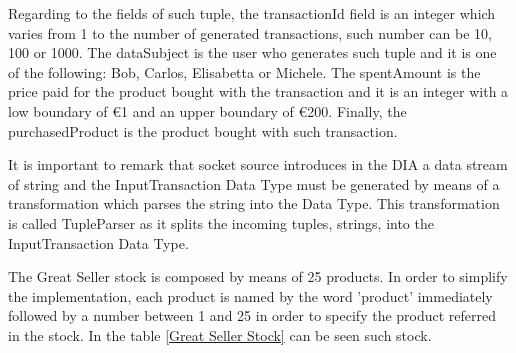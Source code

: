 Regarding to the fields of such tuple, the transactionId field is an integer which varies from 1 to the number of generated transactions, such number can be 10, 100 or 1000. The dataSubject is the user who generates such tuple and it is one of the following: Bob, Carlos, Elisabetta or Michele. The spentAmount is the price paid for the product bought with the transaction and it is an integer with a low boundary of \euro{1} and an upper boundary of \euro{200}. Finally, the purchasedProduct is the product bought with such transaction.

It is important to remark that socket source introduces in the DIA a data stream of string and the InputTransaction Data Type must be generated by means of a transformation which parses the string into the Data Type. This transformation is called TupleParser as it splits the incoming tuples, strings, into the InputTransaction Data Type.

The Great Seller stock is composed by means of 25 products. In order to simplify the implementation, each product is named by the word 'product' immediately followed by a number between 1 and 25 in order to specify the product referred in the stock. In the table \ref{Great Seller Stock} can be seen such stock.

